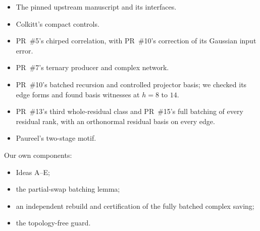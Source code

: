 \documentclass[11pt]{article}
\theoremstyle{remark}\newtheorem*{remark}{Remark}
\begin{document}
\begin{itemize}
\item The pinned upstream manuscript and its interfaces.
\item Colkitt's compact controls.
\item PR~\#5's chirped correlation, with PR~\#10's correction of its Gaussian input error.
\item PR~\#7's ternary producer and complex network.
\item PR~\#10's batched recursion and controlled projector basis; we checked its edge forms and found basis witnesses at $h=8$ to $14$.
\item PR~\#13's third whole-residual class and PR~\#15's full batching of every residual rank, with an orthonormal residual basis on every edge.
\item Paureel's two-stage motif.
\end{itemize}
Our own components:
\begin{itemize}
\item Ideas A--E;
\item the partial-swap batching lemma;
\item an independent rebuild and certification of the fully batched complex saving;
\item the topology-free guard.
\end{itemize}
\end{document}
